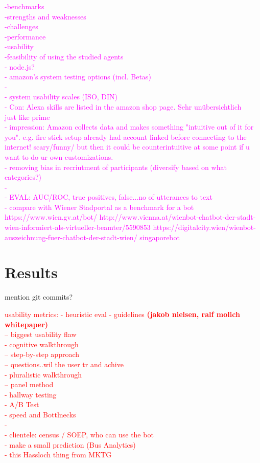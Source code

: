 \textcolor{magenta}{
-benchmarks\\
-strengths and weaknesses\\
-challenges\\
-performance\\
-usability\\
-feasibility of using the studied agents
\\
- node.js?\\
- amazon's system testing options (incl. Betas)\\
-\\
- system usability scales (ISO, DIN)\\
- Con: Alexa skills are listed in the amazon shop page. Sehr un\"ubersichtlich\\ just like prime\\
- impression: Amazon collects data and makes something "intuitive out of it for you". e.g. fire stick setup already had account linked before connecting to the internet! scary/funny/ but then it could be counterintuitive at some point if u want to do ur own customizations.
\\
- removing bias in recriutment of participants (diversify based on what categories?)\\
-\\
- EVAL: AUC/ROC, true positives, false...no of utterances to text\\
- compare with Wiener Stadportal as a benchmark for a bot\\
https://www.wien.gv.at/bot/
http://www.vienna.at/wienbot-chatbot-der-stadt-wien-informiert-als-virtueller-beamter/5590853
https://digitalcity.wien/wienbot-auszeichnung-fuer-chatbot-der-stadt-wien/
singaporebot
}

\section{Results}
\label{results}


mention git commits?

\textcolor{red}{
usability metrics:
- heuristic eval - guidelines \textbf{(jakob nielsen, ralf molich whitepaper)}\\
-- biggest usability flaw\\
- cognitive walkthrough\\
-- step-by-step approach\\
-- questions..wil the user tr and achive\\
- pluralistic walkthrough\\
-- panel method\\
- hallway testing\\
- A/B Test\\
- speed and Bottlnecks\\
-\\
- clientele: census / SOEP, who can use the bot\\
- make a small prediction (Bus Analytics)\\
- this Hassloch thing from MKTG
}


